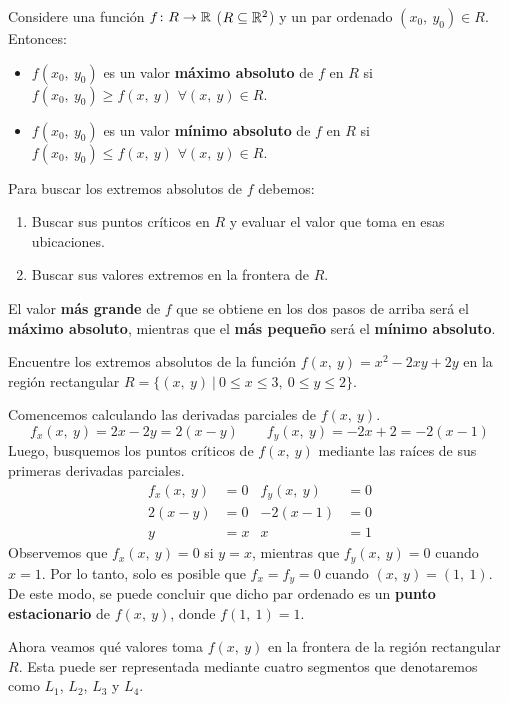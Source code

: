 \documentclass[12pt]{article}
\begin{document}
Considere una función $f \colon R \to \mathbb{R}$ ($R \subseteq \mathbb{R}^{2}$) y un par ordenado $(x_{0}, \ y_{0}) \in R$. Entonces:

\begin{itemize}
\item $f(x_{0}, \ y_{0})$ es un valor \textbf{máximo absoluto} de $f$ en $R$ si $f(x_{0}, \ y_{0}) \geq f(x, \ y)$ $\forall (x, \ y) \in R$.
\item $f(x_{0}, \ y_{0})$ es un valor \textbf{mínimo absoluto} de $f$ en $R$ si $f(x_{0}, \ y_{0}) \leq f(x, \ y)$ $\forall (x, \ y) \in R$.
\end{itemize}

Para buscar los extremos absolutos de $f$ debemos:

\begin{enumerate}
\item Buscar sus puntos críticos en $R$ y evaluar el valor que toma en esas ubicaciones.
\item Buscar sus valores extremos en la frontera de $R$.
\end{enumerate}

El valor \textbf{más grande} de $f$ que se obtiene en los dos pasos de arriba será el \textbf{máximo absoluto}, mientras que el \textbf{más pequeño} será el \textbf{mínimo absoluto}.

\ejemplo Encuentre los extremos absolutos de la función $f(x, \ y) = x^{2} - 2xy + 2y$ en la región rectangular $R = \{(x, \ y) \ | \ 0 \leq x \leq 3, \ 0 \leq y \leq 2\}$.

\solucion  Comencemos calculando las derivadas parciales de $f(x, \ y)$.
\[
  f_{x}(x, \ y) = 2x - 2y = 2(x - y) \qquad f_{y}(x, \ y) = -2x + 2 = -2(x - 1)
\]
Luego, busquemos los puntos críticos de $f(x, \ y)$ mediante las raíces de sus primeras derivadas parciales.
\begin{align*}
f_{x}(x, \ y) &= 0 & f_{y}(x, \ y) &= 0 \\
2(x - y) &= 0 & -2(x - 1) &= 0 \\
y &= x & x &= 1
\end{align*}
Observemos que $f_{x}(x, \ y) = 0$ si $y = x$, mientras que $f_{y}(x, \ y) = 0$ cuando $x = 1$. Por lo tanto, solo es posible que $f_{x} = f_{y} = 0$ cuando $(x, \ y) = (1, \ 1)$. De este modo, se puede concluir que dicho par ordenado es un \textbf{punto estacionario} de $f(x, \ y)$, donde $f(1, \ 1) = 1$.

Ahora veamos qué valores toma $f(x, \ y)$ en la frontera de la región rectangular $R$. Esta puede ser representada mediante cuatro segmentos que denotaremos como $L_{1}$, $L_{2}$, $L_{3}$ y $L_{4}$.
\end{document}
